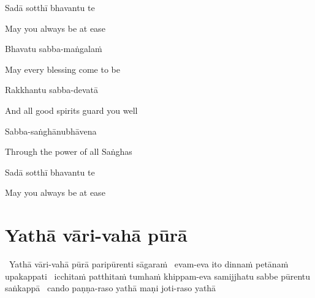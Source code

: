 Sadā sotthī bhavantu te

\begin{english}
  May you always be at ease
\end{english}

Bhavatu sabba-maṅgalaṁ

\begin{english}
  May every blessing come to be
\end{english}

Rakkhantu sabba-devatā

\begin{english}
  And all good spirits guard you well
\end{english}

Sabba-saṅghānubhāvena

\begin{english}
  Through the power of all Saṅghas
\end{english}

Sadā sotthī bhavantu te

\begin{english}
  May you always be at ease
\end{english}



\clearpage

\setsecheadstyle{\subsectionFmt}
\section{Yathā vāri-vahā pūrā}
\label{yatha-vari-vaha-pura}

\vspace{-0.99em}

\begin{leader-yatha}
  \anglebracketleft\ \hspace{-0.5mm}Yathā vāri-vahā pūrā paripūrenti sāgaraṁ \breathmark\ evam-eva ito dinnaṁ petānaṁ upakappati \breathmark\ icchitaṁ patthitaṁ tumhaṁ khippam-eva samijjhatu sabbe pūrentu saṅkappā \breathmark\ cando paṇṇa-raso yathā maṇi joti-raso yathā\hyperlink{endnote119-appendix}{\hypertarget{endnote119-body}{}} \hspace{-0.5mm}\anglebracketright\
\end{leader-yatha}

